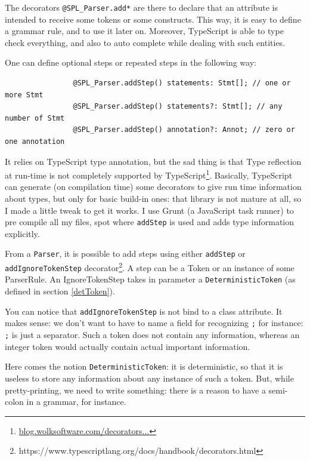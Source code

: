 \documentclass{article}
\newcommand\cc[1]{\lstinline{#1}}
\begin{document}
			The decorators \cc{@SPL_Parser.add*} are there to declare that an attribute is intended to receive some tokens or some constructs. This way, it is easy to define a grammar rule, and to use it later on. Moreover, TypeScript is able to type check everything, and also to auto complete while dealing with such entities.

			One can define optional steps or repeated steps in the following way:
			
			\begin{lstlisting}
				@SPL_Parser.addStep() statements: Stmt[]; // one or more Stmt
				@SPL_Parser.addStep() statements?: Stmt[]; // any number of Stmt
				@SPL_Parser.addStep() annotation?: Annot; // zero or one annotation
			\end{lstlisting}

			It relies on TypeScript type annotation, but the sad thing is that Type reflection at run-time is not completely supported by TypeScript\footnote{\href{http://blog.wolksoftware.com/decorators-metadata-reflection-in-typescript-from-novice-to-expert-part-4}{blog.wolksoftware.com/decorators...}}. Basically, TypeScript can generate (on compilation time) some decorators to give run time information about types, but only for basic build-in ones: that library is not mature at all, so I made a little tweak to get it works. I use Grunt (a JavaScript task runner) to pre compile all my files, spot where \cc{addStep} is used and adds type information explicitly.

			From a \cc{Parser}, it is possible to add steps using either \cc{addStep} or \cc{addIgnoreTokenStep} decorator\footnote{https://www.typescriptlang.org/docs/handbook/decorators.html}. A step can be a Token or an instance of some ParserRule. An IgnoreTokenStep takes in parameter a \cc{DeterministicToken} (as defined in section \ref{detToken}).

			You can notice that \cc{addIgnoreTokenStep} is not bind to a class attribute. It makes sense: we don't want to have to name a field for recognizing \cc{;} for instance: \cc{;} is just a separator. Such a token does not contain any information, whereas an integer token would actually contain actual important information.

			Here comes the notion \cc{DeterministicToken}: it is deterministic, so that it is useless to store any information about any instance of such a token. But, while pretty-printing, we need to write something: there is a reason to have a semi-colon in a grammar, for instance.
\end{document}
